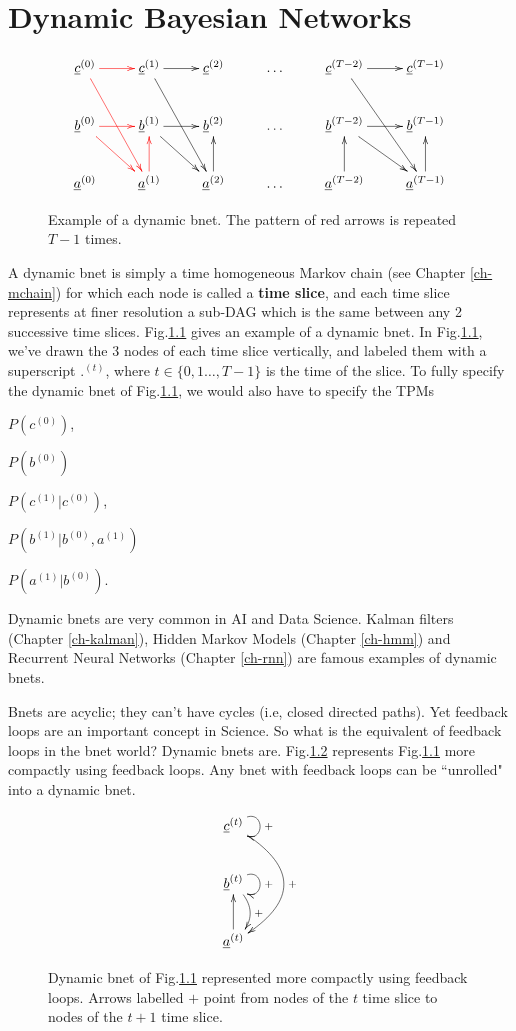 \chapter{Dynamic Bayesian Networks}
\label{ch-dyn-bnet}

\begin{figure}[h!]
$$
\xymatrix{
\rvc^{(0)}\ar@[red][r]\ar@[red][rdd]
&\rvc^{(1)}\ar[r]\ar[rdd]
&\rvc^{(2)}
&\ldots
&\rvc^{(T-2)}\ar[r]\ar[rdd]
&\rvc^{(T-1)}
\\
\rvb^{(0)}\ar@[red][rd]\ar@[red][r]
&\rvb^{(1)}\ar[rd]\ar[r]
&\rvb^{(2)}
&\ldots
&\rvb^{(T-2)}\ar[rd]\ar[r]
&\rvb^{(T-1)}
\\
\rva^{(0)}
&\rva^{(1)}\ar@[red][u]
&\rva^{(2)}\ar[u]
&\ldots
&\rva^{(T-2)}\ar[u]
&\rva^{(T-1)}\ar[u]
}$$
\caption{
Example of a dynamic bnet. The 
pattern of red arrows is repeated $T-1$ times.
}
\label{fig-dyn-bnet}
\end{figure}



A dynamic bnet is simply
a time homogeneous Markov chain (see Chapter
\ref{ch-mchain})
for which each node is 
called a {\bf time slice},
and each time slice 
represents
at finer resolution a sub-DAG
which is the same 
between any
2 successive time slices.
Fig.\ref{fig-dyn-bnet} gives an example
of a dynamic bnet.
In Fig.\ref{fig-dyn-bnet},
we've drawn the 3 nodes of
each time slice vertically,
and labeled them
with a superscript ${.}^{(t)}$,
where $t\in \{
0,1 \ldots, T-1\}$ 
is the time
of the slice.
To fully 
specify the
dynamic bnet
of Fig.\ref{fig-dyn-bnet},
we would also have to specify
the TPMs 

$P(c^{(0)})$, 

$P(b^{(0)})$

$P(c^{(1)}|c^{(0)})$,
 
$P(b^{(1)}|b^{(0)}, a^{(1)})$

$P(a^{(1)}|b^{(0)})$.

Dynamic
bnets 
are very common
in AI and Data Science.
Kalman filters (Chapter \ref{ch-kalman}),
Hidden Markov Models (Chapter \ref{ch-hmm})
and
Recurrent Neural Networks 
(Chapter \ref{ch-rnn})
are famous examples of dynamic
bnets.

Bnets are acyclic; they can't have cycles
(i.e, closed directed paths).
Yet feedback loops are an important
concept in Science. So what is
the equivalent of feedback loops in the
bnet world? Dynamic bnets are.
Fig.\ref{fig-dyn-bnet-compact}
represents
Fig.\ref{fig-dyn-bnet} more 
compactly using feedback loops. 
Any bnet with feedback loops
can be ``unrolled" into a dynamic bnet.


\begin{figure}[h!]
$$
\xymatrix{
\rvc^{(t)}
\ar@/^3pc/[dd]^+
\ar@(ur,dr)[]^+
\\
\rvb^{(t)}
\ar@/^1pc/[d]^+
\ar@(ur,dr)[]^+
\\
\rva^{(t)}\ar[u]
}$$
\caption{
Dynamic bnet of Fig.\ref{fig-dyn-bnet}
represented 
more compactly using feedback loops.
Arrows labelled $+$
point from nodes of the $t$ time slice
to nodes of the $t+1$ time slice.
}
\label{fig-dyn-bnet-compact}
\end{figure}
